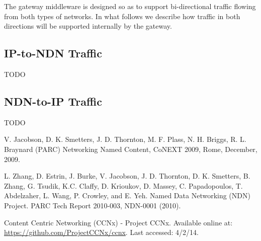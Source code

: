 \documentclass[10pt]{article}
\begin{document}
The gateway middleware is designed so as to support bi-directional traffic flowing from both types of networks. In what follows we describe how traffic in both directions will be supported internally by the gateway.

\subsection{IP-to-NDN Traffic}
TODO

\subsection{NDN-to-IP Traffic}
TODO


\begin{thebibliography}{[MT1]}

 V. Jacobson, D. K. Smetters, J. D. Thornton, M. F. Plass, N. H. Briggs, R. L. Braynard (PARC) Networking Named Content, CoNEXT 2009, Rome, December, 2009.

 L. Zhang, D. Estrin, J. Burke, V. Jacobson, J. D. Thornton, D. K. Smetters, B. Zhang, G. Tsudik, K.C. Claffy, D. Krioukov, D. Massey, C. Papadopoulos, T. Abdelzaher, L. Wang, P. Crowley, and E. Yeh. Named Data Networking (NDN) Project. PARC Tech Report 2010-003, NDN-0001 (2010).

 Content Centric Networking (CCNx) - Project CCNx. Available online at: \url{https://github.com/ProjectCCNx/ccnx}. Last accessed: 4/2/14.

\end{thebibliography}
\end{document}
